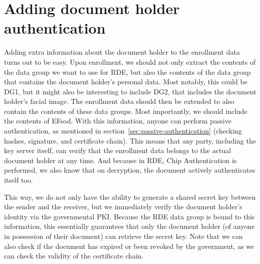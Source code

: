 \section{Adding document holder authentication}\label{sec:adding-document-holder-authentication}
Adding extra information about the document holder to the enrollment data turns out to be easy.
Upon enrollment, we should not only extract the contents of the data group we want to use for RDE, but also the contents of the data group that contains the document holder's personal data.
Most notably, this could be DG1, but it might also be interesting to include DG2, that includes the document holder's facial image.
The enrollment data should then be extended to also contain the contents of these data groups.
Most importantly, we should include the contents of EFsod.
With this information, anyone can perform passive authentication, as mentioned in section~\ref{sec:passive-authentication} (checking hashes, signature, and certificate chain).
This means that any party, including the key server itself, can verify that the enrollment data belongs to the actual document holder at any time.
And because in RDE, Chip Authentication is performed, we also know that on decryption, the document actively authenticates itself too.

This way, we do not only have the ability to generate a shared secret key between the sender and the receiver, but we immediately verify the document holder's identity via the governmental PKI.
Because the RDE data group is bound to this information, this essentially guarantees that only the document holder (of anyone in possession of their document) can retrieve the secret key.
Note that we can also check if the document has expired or been revoked by the government, as we can check the validity of the certificate chain.

